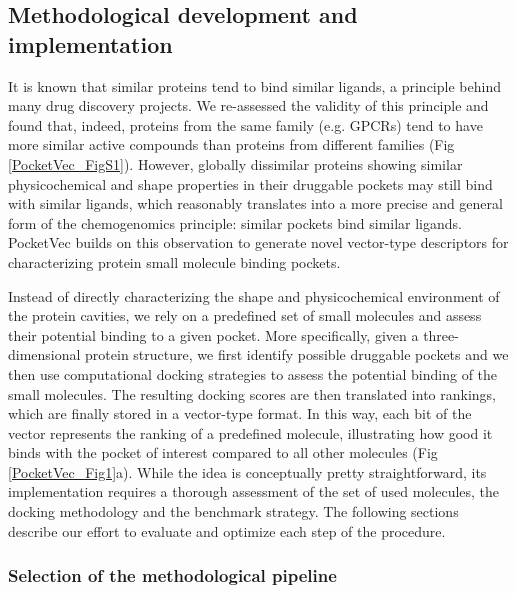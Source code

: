 
\subsection{Methodological development and implementation}
\label{PocketVec_MethDevAndImp}

It is known that similar proteins tend to bind similar ligands\cite{klabunde_chemogenomic_2007}, a principle behind many drug discovery projects\cite{sydow_advances_2019, keiser_relating_2007, falaguera_illuminating_2023}. We re-assessed the validity of this principle and found that, indeed, proteins from the same family (e.g. GPCRs) tend to have more similar active compounds than proteins from different families (Fig \ref{PocketVec_FigS1}). However, globally dissimilar proteins showing similar physicochemical and shape properties in their druggable pockets may still bind with similar ligands, which reasonably translates into a more precise and general form of the chemogenomics principle: similar pockets bind similar ligands\cite{gao_comprehensive_2013}. PocketVec builds on this observation to generate novel vector-type descriptors for characterizing protein small molecule binding pockets. 

Instead of directly characterizing the shape and physicochemical environment of the protein
cavities, we rely on a predefined set of small molecules and assess their potential binding to a
given pocket. More specifically, given a three-dimensional protein structure, we first identify
possible druggable pockets and we then use computational docking strategies to assess the
potential binding of the small molecules. The resulting docking scores are then translated into
rankings, which are finally stored in a vector-type format. In this way, each bit of the vector
represents the ranking of a predefined molecule, illustrating how good it binds with the pocket of
interest compared to all other molecules (Fig \ref{PocketVec_Fig1}a). While the idea is conceptually pretty straightforward, its implementation requires a thorough assessment of the set of used molecules, the docking methodology and the benchmark strategy. The following sections describe our effort to evaluate and optimize each step of the procedure.

\subsubsection{Selection of the methodological pipeline}

